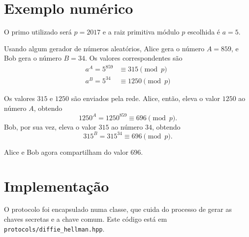 \documentclass{article}
\begin{document}
\section{Exemplo numérico}

O primo utilizado será $p = 2017$
e a raiz primitiva módulo $p$ escolhida é $a = 5$.

Usando algum gerador de números aleatórios,
Alice gera o número $A = 859$,
e Bob gera o número $B = 34$.
Os valores correspondentes são
\begin{align*}
    a^A = 5^{859} &\equiv 315 \pmod p \\
    a^B = 5^{34} &\equiv 1250 \pmod p
\end{align*}

Os valores $315$ e $1250$ são enviados pela rede.
Alice, então,
eleva o valor $1250$ ao número $A$, obtendo
\begin{equation*}
    1250^A = 1250^{859} \equiv 696 \pmod p.
\end{equation*}
Bob, por sua vez,
eleva o valor $315$ ao número $34$, obtendo
\begin{equation*}
    315^B = 315^{34} \equiv 696 \pmod p.
\end{equation*}

Alice e Bob agora compartilham do valor $696$.

\section{Implementação}

O protocolo foi encapsulado numa classe,
que cuida do processo de gerar as chaves secretas e a chave comum.
Este código está em \verb"protocols/diffie_hellman.hpp".
\end{document}
